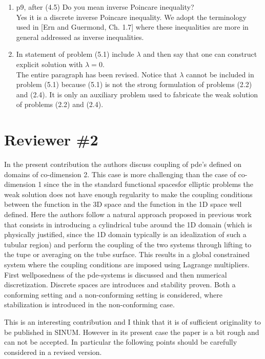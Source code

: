 \documentclass{article}
\newcommand{\fede}[1]{{\color{green!55!blue}#1}}
\begin{document}
\begin{enumerate}
{    CHECK: LEMMA 1.130 FROM ERN AND GUERMOND. (4.4) IS OBTAINED FROM (i) WITH l=1, p=2, m=1. (4.5) IS OBTAINED FROM (ii) WITH l=1, p=2, m=0}
    \item p9, after (4.5) Do you mean inverse Poincare inequality?\\
    \fede{Yes it is a discrete inverse Poincare inequality. We adopt the terminology used in [Ern and Guermond, Ch. 1.7] where these inequalities are more in general addressed as inverse inequalities. }
    \item In statement of problem (5.1) include $\lambda$ and then say that one can construct explicit solution with $\lambda=0$.\\
    \fede{The entire paragraph has been revised. Notice that $\lambda$ cannot be included in problem (5.1) because (5.1) is not the strong formulation of problems (2.2) and (2.4). It is only an auxiliary problem used to fabricate the weak solution of problems (2.2) and (2.4).}
\end{enumerate}

\section*{Reviewer \#2}

In the present contribution the authors discuss coupling of pde's
defined on domains of co-dimension 2. This case is more challenging
than the case of co-dimension 1 since the in the standard functional
spacesfor elliptic problems the weak solution does not
have enough regularity to make the coupling conditions between the
function in the 3D space and the function in the 1D space well
defined. Here the authors follow a natural approach proposed in previous
work that consists in introducing a cylindrical tube
around the 1D domain (which is physically justified, since the 1D
domain typically is an idealization of such a tubular region) and perform
the coupling of the two systems through lifting to the tupe or
averaging on the tube surface. This results in a global constrained
system where the coupling conditions are imposed using Lagrange
multipliers.
First wellposedness of the pde-systems is discussed and then numerical
discretization. Discrete spaces are introduces and stability
proven. Both a conforming setting and a non-conforming setting is
considered, where stabilization is introduced in the non-conforming
case.

This is an interesting contribution and I think that it is of
sufficient originality to be published in SINUM. However in its
present case the paper is a bit rough and can not be accepted. In particular the following
points should be carefully considered in a revised version.
\end{document}
